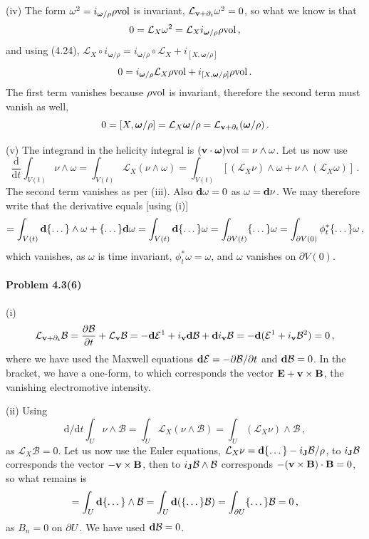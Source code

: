 \documentclass[a4paper,12pt]{article}
\def\d{\mathrm{d}}
\newcommand{\problem}[1]{\paragraph{Problem #1}}
\begin{document}
(iv) The form $\omega^2 = i_{\boldsymbol\omega/\rho}\rho{\rm vol}$ is invariant, $\mathcal{L}_{{\bf v}+\partial_t}\omega^2 =0$, so what we know is that
\[
 0 = \mathcal{L}_{X}\omega^2 = \mathcal{L}_X i_{\boldsymbol\omega/\rho} \rho {\rm vol}\,,
\]
and using (4.24), $\mathcal{L}_X \circ i_{\boldsymbol\omega/\rho} = i_{\boldsymbol\omega/\rho}\circ \mathcal{L}_X + i_{[X, \boldsymbol\omega/\rho]}$
\[
 0 = i_{\boldsymbol\omega/\rho}\mathcal{L}_X \rho{\rm vol}+i_{[X,\boldsymbol\omega/\rho]}\rho{\rm vol}\,.
\]
The first term vanishes because $\rho{\rm vol}$ is invariant, therefore the second term must vanish as well,
\[
 0 = [X, \boldsymbol\omega/\rho] = \mathcal{L}_{X}\boldsymbol\omega/\rho = \mathcal{L}_{{\bf v}+\partial_t}(\boldsymbol\omega/\rho)\,.
\]

(v) The integrand in the helicity integral is $({\bf v}\cdot \boldsymbol{\omega}){\rm vol} = \nu \wedge \omega$. Let us now use
\[
 \frac{\d}{\d t}\int_{V(t)} \nu \wedge \omega = \int_{V(t)} \mathcal{L}_{X} (\nu\wedge \omega) = \int_{V(t)}\left[ (\mathcal{L}_X\nu)\wedge \omega + \nu \wedge (\mathcal{L}_X \omega)\right]\,.
\]
The second term vanishes as per (iii). Also ${\bf d}\omega = 0$ as $\omega={\bf d}\nu$. We may therefore write that the derivative equals [using (i)]
\[
 = \int_{V(t)} {\bf d}\{\dots \} \wedge \omega + \{\dots \} {\bf d} \omega = \int_{V(t)}{\bf d} \{\dots\}\omega = \int_{\partial V(t)} \{\dots\} \omega = \int_{\partial V(0)}\phi_t^* \{\dots\}\omega\,,
\]
which vanishes, as $\omega$ is time invariant, $\phi_t^*\omega = \omega$, and $\omega$ vanishes on $\partial V(0)$.


\problem{4.3(6)} (i)
\[
\mathcal{L}_{{\bf v}+\partial_t} \mathcal{B} = \frac{\partial\mathcal{B}}{\partial t}+\mathcal{L}_{\bf v}\mathcal{B} = -{\bf d}\mathcal{E}^1 + i_{\bf v}{\bf d}\mathcal{B} + {\bf d}i_{\bf v}\mathcal{B} = -{\bf d}(\mathcal{E}^1 + i_{\bf v}\mathcal{B}^2) = 0\,,
\]
where we have used the Maxwell equations ${\bf d}\mathcal E=-\partial\mathcal B/\partial t$ and ${\bf d}\mathcal B = 0$. In the bracket, we have a one-form, to which corresponds the vector ${\bf E}+ {\bf v}\times {\bf B}$, the vanishing electromotive intensity.

(ii) Using
\[\d/\d t \int_U \nu\wedge\mathcal B = \int_U \mathcal{L}_{X}(\nu\wedge \mathcal{B}) = \int_U (\mathcal{L}_{X}\nu)\wedge \mathcal{B}\,,
\]
as $\mathcal{L}_X \mathcal B =0$. Let us now use the Euler equations, $\mathcal{L}_{X}\nu = {\bf d}\{\dots\} - i_{\bf J}\mathcal{B}/\rho$, to $i_{\bf J}\mathcal{B}$ corresponds the vector $-{\bf v}\times {\bf B}$, then to $i_{\bf J}\mathcal{B}\wedge \mathcal B$ corresponds $-({\bf v}\times {\bf B})\cdot {\bf B} = 0$, so what remains is
\[
 = \int_U {\bf d}\{\dots\} \wedge \mathcal B = \int_U {\bf d}(\{\dots\}\mathcal B) = \int_{\partial U} \{\dots\}\mathcal B = 0\,,
\]
as $B_n=0$ on $\partial U$\,. We have used ${\bf d}\mathcal B =0$.
\end{document}
